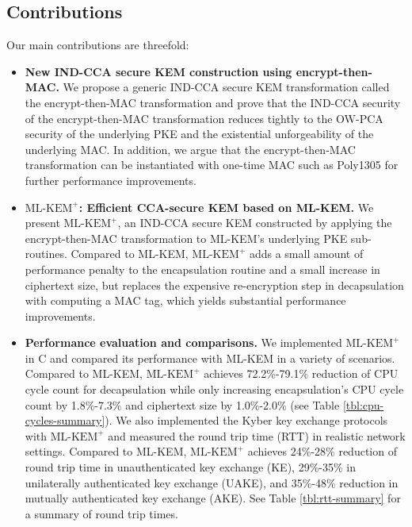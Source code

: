 \documentclass[journal=tches,submission]{iacrtrans}
\def\mlkemplus{\text{ML-KEM}^+}
\begin{document}
\subsection{Contributions}
Our main contributions are threefold: \begin{itemize}
    \item {\bf New IND-CCA secure KEM construction using encrypt-then-MAC.} We propose a generic IND-CCA secure KEM transformation called the encrypt-then-MAC transformation and prove that the IND-CCA security of the encrypt-then-MAC transformation reduces tightly to the OW-PCA security of the underlying PKE and the existential unforgeability of the underlying MAC. In addition, we argue that the encrypt-then-MAC transformation can be instantiated with one-time MAC such as Poly1305 for further performance improvements.
    \item {\bf $\mlkemplus$: Efficient CCA-secure KEM based on ML-KEM.} We present $\mlkemplus$, an IND-CCA secure KEM constructed by applying the encrypt-then-MAC transformation to ML-KEM's underlying PKE sub-routines. Compared to ML-KEM, $\mlkemplus$ adds a small amount of performance penalty to the encapsulation routine and a small increase in ciphertext size, but replaces the expensive re-encryption step in decapsulation with computing a MAC tag, which yields substantial performance improvements.
    \item {\bf Performance evaluation and comparisons.} We implemented $\mlkemplus$ in C and compared its performance with ML-KEM in a variety of scenarios. Compared to ML-KEM, $\mlkemplus$ achieves 72.2\%-79.1\% reduction of CPU cycle count for decapsulation while only increasing encapsulation's CPU cycle count by 1.8\%-7.3\% and ciphertext size by 1.0\%-2.0\% (see Table \ref{tbl:cpu-cycles-summary}). We also implemented the Kyber key exchange protocols \cite{DBLP:conf/eurosp/BosDKLLSSSS18} with $\mlkemplus$ and measured the round trip time (RTT) in realistic network settings. Compared to ML-KEM, $\mlkemplus$ achieves 24\%-28\% reduction of round trip time in unauthenticated key exchange (KE), 29\%-35\% in unilaterally authenticated key exchange (UAKE), and 35\%-48\% reduction in mutually authenticated key exchange (AKE). See Table \ref{tbl:rtt-summary} for a summary of round trip times.
\end{itemize}
\end{document}
